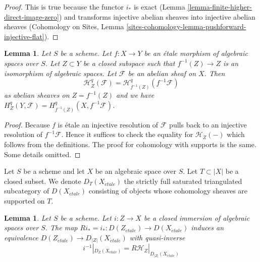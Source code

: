 \documentclass{stacks-project}
\theoremstyle{plain}
\newtheorem{lemma}[subsection]{Lemma}
\theoremstyle{definition}
\theoremstyle{remark}
\numberwithin{equation}{subsection}
\def\etale{{\acute{e}tale}}
\begin{document}
\begin{proof}
This is true because the functor $i_*$ is exact
(Lemma \ref{lemma-finite-higher-direct-image-zero}) and transforms
injective abelian sheaves into injective abelian sheaves
(Cohomology on Sites, Lemma
\ref{sites-cohomology-lemma-pushforward-injective-flat}).
\end{proof}

\begin{lemma}
\label{lemma-etale-localization-sheaf-with-support}
Let $S$ be a scheme. Let $f : X \to Y$ be an \'etale morphism of
algebraic spaces over $S$. Let $Z \subset Y$ be a closed subspace
such that $f^{-1}(Z) \to Z$ is an isomorphism of algebraic spaces.
Let $\mathcal{F}$ be an abelian sheaf on $X$. Then
$$
\mathcal{H}^q_Z(\mathcal{F}) = \mathcal{H}^q_{f^{-1}(Z)}(f^{-1}\mathcal{F})
$$
as abelian sheaves on $Z = f^{-1}(Z)$ and we
have $H^q_Z(Y, \mathcal{F}) = H^q_{f^{-1}(Z)}(X, f^{-1}\mathcal{F})$.
\end{lemma}

\begin{proof}
Because $f$ is \'etale an injective resolution of $\mathcal{F}$
pulls back to an injective resolution of $f^{-1}\mathcal{F}$.
Hence it suffices to check the equality for $\mathcal{H}_Z(-)$
which follows from the definitions. The proof for cohomology with
supports is the same. Some details omitted.
\end{proof}

\noindent
Let $S$ be a scheme and let $X$ be an algebraic space over $S$.
Let $T \subset |X|$ be a closed subset.
We denote $D_T(X_\etale)$ the
strictly full saturated triangulated subcategory of $D(X_\etale)$
consisting of objects whose cohomology sheaves are supported on $T$.

\begin{lemma}
\label{lemma-complexes-with-support-on-closed}
Let $S$ be a scheme.
Let $i : Z \to X$ be a closed immersion of algebraic spaces over $S$.
The map $Ri_* = i_* : D(Z_\etale) \to D(X_\etale)$
induces an equivalence $D(Z_\etale) \to D_{|Z|}(X_\etale)$ with quasi-inverse
$$
i^{-1}|_{D_Z(X_\etale)} = R\mathcal{H}_Z|_{D_{|Z|}(X_\etale)}
$$
\end{lemma}
\end{document}
